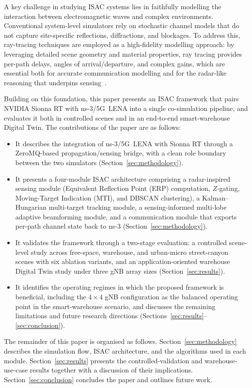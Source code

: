 A key challenge in studying ISAC systems lies in faithfully modelling the
interaction between electromagnetic waves and complex environments.
Conventional system-level simulators rely on stochastic channel models that do
not capture site-specific reflections, diffractions, and blockages. To address
this, ray-tracing techniques are employed as a high-fidelity modelling
approach: by leveraging detailed scene geometry and material properties, ray
tracing provides per-path delays, angles of arrival/departure, and complex
gains, which are essential both for accurate communication modelling and for
the radar-like reasoning that underpins
sensing~\cite{ref:sionna_rt,ref:ns3sionna}.

Building on this foundation, this paper presents an ISAC framework that pairs
NVIDIA Sionna RT with ns-3/5G~LENA into a single co-simulation pipeline, and
evaluates it both in controlled scenes and in an end-to-end smart-warehouse
Digital Twin. The contributions of the paper are as follows:
\begin{itemize}
  \item It describes the integration of ns-3/5G~LENA with Sionna RT through a
        ZeroMQ-based propagation/sensing bridge, with a clean role boundary
        between the two simulators (Section~\ref{sec:methodology}).
  \item It presents a four-module ISAC architecture comprising a
        radar-inspired sensing module (Equivalent Reflection Point (ERP)
        computation, $Z$-gating, Moving-Target Indication (MTI), and DBSCAN
        clustering), a Kalman--Hungarian multi-target tracking module, a
        sensing-informed multi-lobe adaptive beamforming module, and a
        communication module that exports per-path channel state back to
        ns-3 (Section~\ref{sec:methodology}).
  \item It validates the framework through a two-stage evaluation: a
        controlled scene-level study across free-space, warehouse, and
        urban-micro street-canyon scenes with six ablation variants, and an
        application-oriented warehouse Digital Twin study under three gNB
        array sizes (Section~\ref{sec:results}).
  \item It identifies the operating regimes in which the proposed framework
        is beneficial, including the $4{\times}4$ gNB configuration as the
        balanced operating point in the smart-warehouse scenario, and
        discusses the remaining limitations and future research directions
        (Sections~\ref{sec:results}--\ref{sec:conclusion}).
\end{itemize}

The remainder of this paper is organised as follows.
Section~\ref{sec:methodology} describes the simulation flow, ISAC
architecture, and the algorithms used in each module.
Section~\ref{sec:results} presents the controlled-validation and
warehouse-use-case results together with a discussion of their implications.
Section~\ref{sec:conclusion} concludes the paper and outlines future work.
